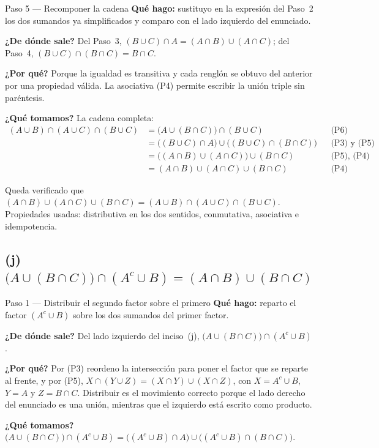 \documentclass[11pt]{article}
\begin{document}
\begin{paso}{Paso 5 --- Recomponer la cadena}
\textbf{Qué hago:} sustituyo en la expresión del Paso~2 los dos sumandos ya simplificados y
comparo con el lado izquierdo del enunciado.

\textbf{¿De dónde sale?} Del Paso~3, $(B\cup C)\cap A=(A\cap B)\cup(A\cap C)$; del Paso~4,
$(B\cup C)\cap(B\cap C)=B\cap C$.

\textbf{¿Por qué?} Porque la igualdad es transitiva y cada renglón se obtuvo del anterior por una
propiedad válida. La asociativa (P4) permite escribir la unión triple sin paréntesis.

\textbf{¿Qué tomamos?} La cadena completa:
\begin{align*}
(A\cup B)\cap(A\cup C)\cap(B\cup C)
&=\bigl(A\cup(B\cap C)\bigr)\cap(B\cup C) && \text{(P6) distributiva, factorizando}\\
&=\bigl((B\cup C)\cap A\bigr)\cup\bigl((B\cup C)\cap(B\cap C)\bigr) && \text{(P3) y (P5)}\\
&=\bigl((A\cap B)\cup(A\cap C)\bigr)\cup(B\cap C) && \text{(P5), (P4) y (P11)}\\
&=(A\cap B)\cup(A\cap C)\cup(B\cap C) && \text{(P4) asociativa}
\end{align*}
\end{paso}

\begin{resp}
Queda verificado que $(A\cap B)\cup(A\cap C)\cup(B\cap C)=(A\cup B)\cap(A\cup C)\cap(B\cup C)$.
Propiedades usadas: distributiva en los dos sentidos, conmutativa, asociativa e idempotencia.
\end{resp}

\subsection*{(j) \ $\bigl(A\cup(B\cap C)\bigr)\cap(A^{c}\cup B)=(A\cap B)\cup(B\cap C)$}

\begin{paso}{Paso 1 --- Distribuir el segundo factor sobre el primero}
\textbf{Qué hago:} reparto el factor $(A^{c}\cup B)$ sobre los dos sumandos del primer factor.

\textbf{¿De dónde sale?} Del lado izquierdo del inciso~(j),
$\bigl(A\cup(B\cap C)\bigr)\cap(A^{c}\cup B)$.

\textbf{¿Por qué?} Por (P3) reordeno la intersección para poner el factor que se reparte al
frente, y por (P5), $X\cap(Y\cup Z)=(X\cap Y)\cup(X\cap Z)$, con $X=A^{c}\cup B$, $Y=A$ y
$Z=B\cap C$. Distribuir es el movimiento correcto porque el lado derecho del enunciado es una
unión, mientras que el izquierdo está escrito como producto.

\textbf{¿Qué tomamos?}
$\bigl(A\cup(B\cap C)\bigr)\cap(A^{c}\cup B)=\bigl((A^{c}\cup B)\cap A\bigr)\cup\bigl((A^{c}\cup B)\cap(B\cap C)\bigr)$.
\end{paso}
\end{document}
